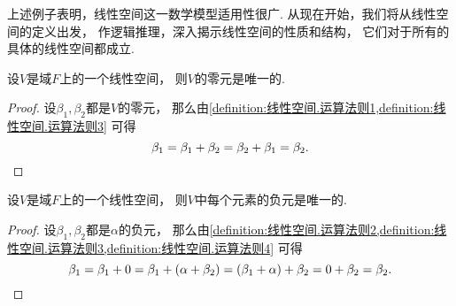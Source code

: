上述例子表明，线性空间这一数学模型适用性很广.
从现在开始，我们将从线性空间的定义出发，
作逻辑推理，深入揭示线性空间的性质和结构，
它们对于所有的具体的线性空间都成立.

\begin{property}%
设\(V\)是域\(F\)上的一个线性空间，
则\(V\)的零元是唯一的.
\begin{proof}
设\(\beta_1,\beta_2\)都是\(V\)的零元，
那么由\cref{definition:线性空间.运算法则1,definition:线性空间.运算法则3}
可得\begin{equation*}
	\beta_1
	= \beta_1 + \beta_2
	= \beta_2 + \beta_1
	= \beta_2.
	\qedhere
\end{equation*}
\end{proof}
\end{property}

\begin{property}\label{theorem:线性空间.线性空间的结构.线性空间的性质2}
设\(V\)是域\(F\)上的一个线性空间，
则\(V\)中每个元素的负元是唯一的.
\begin{proof}
设\(\beta_1,\beta_2\)都是\(\alpha\)的负元，
那么由\cref{definition:线性空间.运算法则2,definition:线性空间.运算法则3,definition:线性空间.运算法则4}
可得\begin{equation*}
	\beta_1
	= \beta_1 + 0
	= \beta_1 + (\alpha + \beta_2)
	= (\beta_1 + \alpha) + \beta_2
	= 0 + \beta_2
	= \beta_2.
	\qedhere
\end{equation*}
\end{proof}
\end{property}

